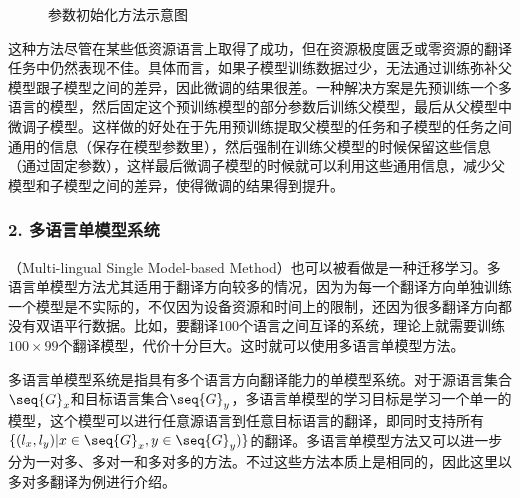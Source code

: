 \begin{figure}[h]
\centering

\caption{参数初始化方法示意图}
\label{fig:16-14}
\end{figure}

\parinterval 这种方法尽管在某些低资源语言上取得了成功，但在资源极度匮乏或零资源的翻译任务中仍然表现不佳。具体而言，如果子模型训练数据过少，无法通过训练弥补父模型跟子模型之间的差异，因此微调的结果很差。一种解决方案是先预训练一个多语言的模型，然后固定这个预训练模型的部分参数后训练父模型，最后从父模型中微调子模型。这样做的好处在于先用预训练提取父模型的任务和子模型的任务之间通用的信息（保存在模型参数里），然后强制在训练父模型的时候保留这些信息（通过固定参数），这样最后微调子模型的时候就可以利用这些通用信息，减少父模型和子模型之间的差异，使得微调的结果得到提升。

\subsubsection{2. 多语言单模型系统} \label{sec:multi-lang-single-model}

（Multi-lingual Single Model-based Method）也可以被看做是一种迁移学习。多语言单模型方法尤其适用于翻译方向较多的情况，因为为每一个翻译方向单独训练一个模型是不实际的，不仅因为设备资源和时间上的限制，还因为很多翻译方向都没有双语平行数据。比如，要翻译100个语言之间互译的系统，理论上就需要训练$100 \times 99$个翻译模型，代价十分巨大。这时就可以使用多语言单模型方法。

\parinterval 多语言单模型系统是指具有多个语言方向翻译能力的单模型系统。对于源语言集合$\seq{G}_x$和目标语言集合$\seq{G}_y$，多语言单模型的学习目标是学习一个单一的模型，这个模型可以进行任意源语言到任意目标语言的翻译，即同时支持所有$\{(l_x,l_y)|x \in \seq{G}_x,y \in \seq{G}_y)\}$的翻译。多语言单模型方法又可以进一步分为一对多、多对一和多对多的方法。不过这些方法本质上是相同的，因此这里以多对多翻译为例进行介绍。

